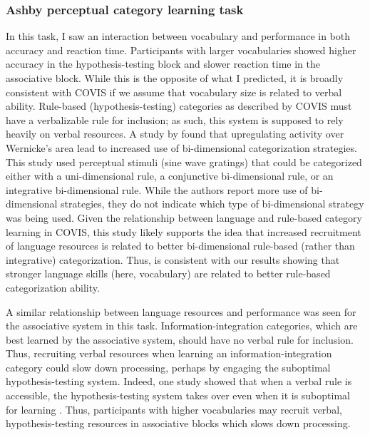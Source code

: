 \documentclass[../dissertation.tex]{subfiles}
\begin{document}
\subsubsection{Ashby perceptual category learning task}
	In this task, I saw an interaction between vocabulary and performance in both accuracy and reaction time. Participants with larger vocabularies showed higher accuracy in the hypothesis-testing block and slower reaction time in the associative block. While this is the opposite of what I predicted, it is broadly consistent with COVIS if we assume that vocabulary size is related to verbal ability. Rule-based (hypothesis-testing) categories as described by COVIS must have a verbalizable rule for inclusion; as such, this system is supposed to rely heavily on verbal resources. A study by \citet{Perry2014} found that upregulating activity over Wernicke's area lead to increased use of bi-dimensional categorization strategies. This study used perceptual stimuli (sine wave gratings) that could be categorized either with a uni-dimensional rule, a conjunctive bi-dimensional rule, or an integrative bi-dimensional rule. While the authors report more use of bi-dimensional strategies, they do not indicate which type of bi-dimensional strategy was being used. Given the relationship between language and rule-based category learning in COVIS, this study likely supports the idea that increased recruitment of language resources is related to better bi-dimensional rule-based (rather than integrative) categorization. Thus, \citet{Perry2014} is consistent with our results showing that stronger language skills (here, vocabulary) are related to better rule-based categorization ability. \par
	 A similar relationship between language resources and performance was seen for the associative system in this task. Information-integration categories, which are best learned by the associative system, should have no verbal rule for inclusion. Thus, recruiting verbal resources when learning an information-integration category could slow down processing, perhaps by engaging the suboptimal hypothesis-testing system. Indeed, one study showed that when a verbal rule is accessible, the hypothesis-testing system takes over even when it is suboptimal for learning \citep{Noseworthy2011}. Thus, participants with higher vocabularies may recruit verbal, hypothesis-testing resources in associative blocks which slows down processing. \par
\end{document}
